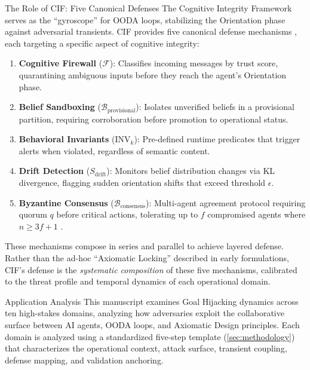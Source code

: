 \documentclass[
  ignorenonframetext,
]{beamer}
\providecommand{\tightlist}{%
  \setlength{\itemsep}{0pt}\setlength{\parskip}{0pt}}
\begin{document}
\begin{frame}[allowframebreaks]{The Role of CIF: Five Canonical
Defenses}
\protect{}\label{the-role-of-cif-five-canonical-defenses}
The Cognitive Integrity Framework serves as the ``gyroscope'' for OODA
loops, stabilizing the Orientation phase against adversarial transients.
CIF provides five canonical defense mechanisms
\cite{friedman2026cogsec1}, each targeting a specific aspect of
cognitive integrity:

\begin{enumerate}
\tightlist
\item
  \textbf{Cognitive Firewall} (\(\mathcal{F}\)): Classifies incoming
  messages by trust score, quarantining ambiguous inputs before they
  reach the agent's Orientation phase.
\item
  \textbf{Belief Sandboxing} (\(\mathcal{B}_{\text{provisional}}\)):
  Isolates unverified beliefs in a provisional partition, requiring
  corroboration before promotion to operational status.
\item
  \textbf{Behavioral Invariants} (\(\text{INV}_k\)): Pre-defined runtime
  predicates that trigger alerts when violated, regardless of semantic
  content.
\item
  \textbf{Drift Detection} (\(S_{\text{drift}}\)): Monitors belief
  distribution changes via KL divergence, flagging sudden orientation
  shifts that exceed threshold \(\epsilon\).
\item
  \textbf{Byzantine Consensus} (\(\mathcal{B}_{\text{consensus}}\)):
  Multi-agent agreement protocol requiring quorum \(q\) before critical
  actions, tolerating up to \(f\) compromised agents where
  \(n \geq 3f+1\) \cite{lamport1982byzantine}.
\end{enumerate}

These mechanisms compose in series and parallel to achieve layered
defense. Rather than the ad-hoc ``Axiomatic Locking'' described in early
formulations, CIF's defense is the \emph{systematic composition} of
these five mechanisms, calibrated to the threat profile and temporal
dynamics of each operational domain.
\end{frame}

\begin{frame}[allowframebreaks]{Application Analysis}
\protect{}\label{application-analysis}
This manuscript examines Goal Hijacking dynamics across ten high-stakes
domains, analyzing how adversaries exploit the collaborative surface
between AI agents, OODA loops, and Axiomatic Design principles. Each
domain is analyzed using a standardized five-step template
(\cref{sec:methodology}) that characterizes the operational context,
attack surface, transient coupling, defense mapping, and validation
anchoring.
\end{frame}
\end{document}
